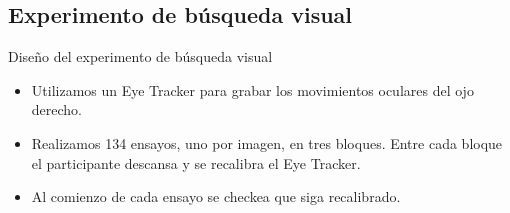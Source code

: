 \documentclass[compress]{beamer}
\begin{document}
\subsection{Experimento de búsqueda visual}
\begin{frame}{Diseño del experimento de búsqueda visual}

\begin{itemize}
\item Utilizamos un Eye Tracker para grabar los movimientos oculares del ojo derecho.
\item Realizamos 134 ensayos, uno por imagen, en tres bloques. Entre cada bloque el participante descansa y se recalibra el Eye Tracker.
\item Al comienzo de cada ensayo se checkea que siga recalibrado.
\end{itemize}

\end{frame}
\end{document}
